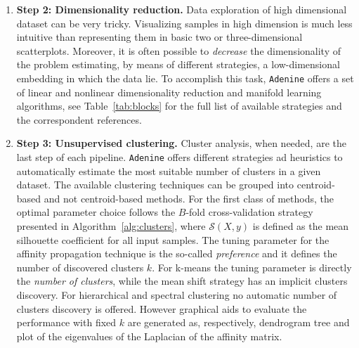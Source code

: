 \documentclass[twoside,11pt]{article}
\makeatletter
\newcommand{\ade}{\texttt{Adenine}\@\xspace}
\makeatother
\begin{document}
\begin{enumerate}
  \item[]{\bf Step 2: Dimensionality reduction.}
  Data exploration of high dimensional dataset can be very tricky. Visualizing samples in high dimension is much less intuitive than representing them in basic two or three-dimensional scatterplots. Moreover, it is often possible to \emph{decrease} the dimensionality of the problem estimating, by means of different strategies, a low-dimensional embedding in which the data lie. To accomplish this task, \ade offers a set of linear and nonlinear dimensionality reduction and manifold learning algorithms, see Table~\ref{tab:blocks} for the full list of available strategies and the correspondent references.

  \item[]{\bf Step 3: Unsupervised clustering.}
  Cluster analysis, when needed, are the last step of each pipeline. \ade offers different strategies ad heuristics to automatically estimate the most suitable number of clusters in a given dataset. The available clustering techniques can be grouped into centroid-based and not centroid-based methods. For the first class of methods, the optimal parameter choice follows the $B$-fold cross-validation strategy presented in Algorithm~\ref{alg:clusters}, where $\mathcal{S}(X,y)$ is defined as the mean silhouette coefficient \citep{rousseeuw1987silhouettes} for all input samples.
  The tuning parameter for the affinity propagation technique \citep{frey2007clustering} is the so-called \emph{preference} and it defines the number of discovered clusters $k$. For k-means \citep{bishop2006pattern} the tuning parameter is directly the \emph{number of clusters}, while the mean shift strategy \citep{comaniciu2002mean} has an implicit clusters discovery. For hierarchical \citep{friedman2001elements} and spectral clustering \citep{shi2000normalized} no automatic number of clusters discovery is offered. However graphical aids to evaluate the performance with fixed $k$ are generated as, respectively, dendrogram tree and plot of the eigenvalues of the Laplacian of the affinity matrix.


\end{enumerate}
\end{document}

